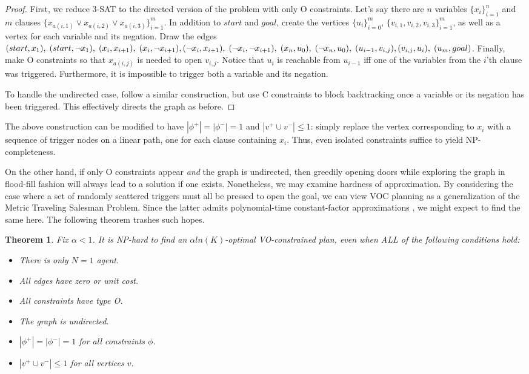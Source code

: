 \documentclass[letterpaper]{article}
\newtheorem{thm}{Theorem}
\begin{document}
\begin{proof}
First, we reduce 3-SAT to the directed version of the problem with only O constraints. Let's say there are $n$ variables $\{x_i\}_{i=1}^n$ and $m$ clauses $\{x_{a(i,1)} \vee x_{a(i,2)} \vee x_{a(i,3)} \}_{i=1}^m$. In addition to $start$ and $goal$, create the vertices $\{u_i\}_{i=0}^m$, $\{v_{i,1},v_{i,2},v_{i,3}\}_{i=1}^m$, as well as a vertex for each variable and its negation. Draw the edges
$(start,x_1),\;(start,\neg x_1),\;(x_i,x_{i+1}),\;(x_i,\neg x_{i+1}),\;
\\(\neg x_i,x_{i+1}),\;(\neg x_i,\neg x_{i+1}),\;(x_n,u_0),\;(\neg x_n,u_0),\;(u_{i-1},v_{i,j}),\;
\\(v_{i,j},u_i),\;(u_m,goal)$.
Finally, make O constraints so that $x_{a(i,j)}$ is needed to open $v_{i,j}$. Notice that $u_i$ is reachable from $u_{i-1}$ iff one of the variables from the $i$'th clause was triggered. Furthermore, it is impossible to trigger both a variable and its negation.

To handle the undirected case, follow a similar construction, but use C constraints to block backtracking once a variable or its negation has been triggered. This effectively directs the graph as before.
\end{proof}

The above construction can be modified to have $|\phi^+| = |\phi^-| = 1$ and $|v^+ \cup v^-| \le 1$: simply replace the vertex corresponding to $x_i$ with a sequence of trigger nodes on a linear path, one for each clause containing $x_i$. Thus, even isolated constraints suffice to yield NP-completeness.

On the other hand, if only O constraints appear \emph{and} the graph is undirected, then greedily opening doors while exploring the graph in flood-fill fashion will always lead to a solution if one exists. Nonetheless, we may examine hardness of approximation. By considering the case where a set of randomly scattered triggers must all be pressed to open the goal, we can view VOC planning as a generalization of the Metric Traveling Salesman Problem. Since the latter admits polynomial-time constant-factor approximations \cite{christofides1976worst}, we might expect to find the same here. The following theorem trashes such hopes.

\begin{thm}
\label{thm:NP2}
Fix $\alpha < 1$. It is NP-hard to find an $\alpha ln(K)$-optimal VO-constrained plan, even when ALL of the following conditions hold:
\begin{itemize}
\item There is only $N=1$ agent.
\item All edges have zero or unit cost.
\item All constraints have type O.
\item The graph is undirected.
\item $|\phi^+| = |\phi^-| = 1$ for all constraints $\phi$.
\item $|v^+ \cup v^-| \le 1$ for all vertices $v$.
\end{itemize}
\end{thm}
\end{document}
